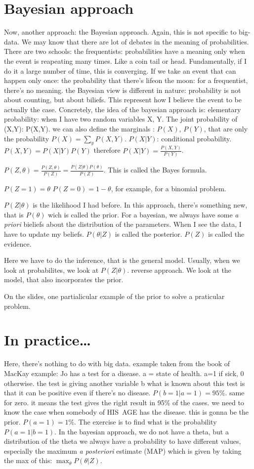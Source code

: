 \documentclass[a4paper]{tufte-book}
\begin{document}
\section{Bayesian approach}

Now, another approach: the Bayesian approach. Again, this is not specific to big-data.
We may know that there are lot of debates in the meaning of probabilities. There
are two schools: the frequentists: probabilities have a meaning only when the
event is reapeating many times. Like a coin tail or head. Fundamentally, if I do
it a large number of time, this is converging.
If we take an event that can happen only once: the probability that there's lifeon the moon: for a frequentist, there's no meaning.
the Bayesian view is different in nature: probability is not about counting, but
about biliefs. This represent how I believe the event to be actually the case.
Concretely, the idea of the bayesian approach is:
elementary probability: when I have two random variables X, Y.
The joint probability of (X,Y): P(X,Y). we can also define the marginals :
$P(X)$, $P(Y)$, that are only the probability $P(X) = \sum_y P(X,Y)$.
$P(X|Y)$: conditional probability.
$P(X,Y) = P(X|Y)P(Y)$
therefore $P(X|Y) = \frac{P(X,Y)}{P(Y)}$.


$P(Z,\theta) = \frac{P(Z,\theta)}{P(Z)} = \frac{P(Z|\theta)P(\theta)}{P(Z)}$.
This is called the Bayes formula.

$P(Z=1) = \theta$
$P(Z=0) = 1-\theta$, for example, for a binomial problem.

$P(Z|\theta)$ is the likelihood I had before.
In this approach, there's something new, that is $P(\theta)$ wich is called the prior.
For a bayesian, we always have some \emph{a priori} bieliefs about the
distribution of the parameters. When I see the data, I have to update my
beliefs.
$P(\theta|Z)$ is called the posterior.
$P(Z)$ is called the evidence.

Here we have to do the inference, that is the general model. Usually, when we
look at probabilites, we look at $P(Z|\theta)$. reverse approach.
We look at  the model, that also incorporates the prior.

On the slides, one partialicular example of the prior to solve a praticular problem.

\section{In practice\dots}
Here, there's nothing to do with big data. example taken from the book of MacKay
example: Jo has a test for a disease. a = state of health.
a=1 if sick, 0 otherwise.
the test is giving another variable b
what is known about this test is that it can be positive even if there's no
disease. $P(b=1|a=1) = 95\%$. same for zero.
it means the test gives the right result in 95\% of the cases.
we need to know the case when somebody of HIS AGE has the disease. this
is gonna be the prior. $P(a=1) = 1\%$.
The exercise is to find what is the probability $P(a=1|b=1)$.
In the bayesian approach, we do not have a theta, but a distribution of the theta
we always have a probability to have different values, especially the maximum
\emph{a posteriori} estimate (MAP)
which is given by taking the max of this:
$\max_\theta P(\theta|Z)$.
\end{document}
